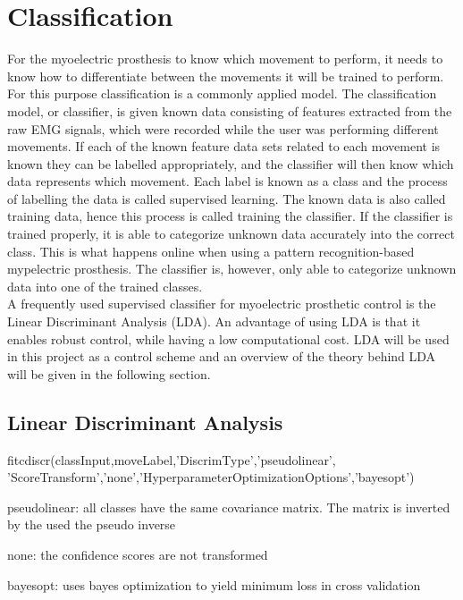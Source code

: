 \section{Classification}
For the myoelectric prosthesis to know which movement to perform, it needs to know how to differentiate between the movements it will be trained to perform. For this purpose classification is a commonly applied model. The classification model, or classifier, is given known data consisting of features extracted from the raw EMG signals, which were recorded while the user was performing different movements. If each of the known feature data sets related to each movement is known they can be labelled appropriately, and the classifier will then know which data represents which movement. Each label is known as a class and the process of labelling the data is called supervised learning. The known data is also called training data, hence this process is called training the classifier. If the classifier is trained properly, it is able to categorize unknown data accurately into the correct class. This is what happens online when using a pattern recognition-based mypelectric prosthesis. The classifier is, however, only able to categorize unknown data into one of the trained classes. \\
A frequently used supervised classifier for myoelectric prosthetic control is the Linear Discriminant Analysis (LDA). An advantage of using LDA is that it enables robust control, while having a low computational cost. LDA will be used in this project as a control scheme and an overview of the theory behind LDA will be given in the following section.

\subsection{Linear Discriminant Analysis} 


fitcdiscr(classInput,moveLabel,'DiscrimType','pseudolinear', 'ScoreTransform','none','HyperparameterOptimizationOptions','bayesopt')

pseudolinear: all classes have the same covariance matrix. The matrix is inverted by the used the pseudo inverse

none: the confidence scores are not transformed

bayesopt: uses bayes optimization to yield minimum loss in cross validation